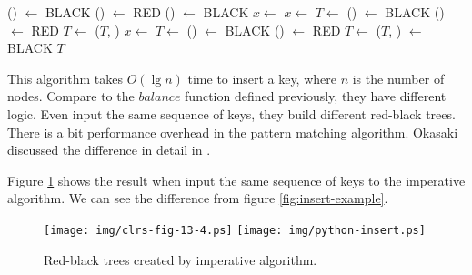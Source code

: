 \documentclass[b5paper]{article}
\begin{document}
\begin{algorithmic}[1]
      \State {}() $\gets$ BLACK
      \State {}() $\gets$ RED
      \State {}() $\gets$ BLACK
      \State $x \gets$ 
    \Else
          \State $x \gets$ 
          \State $T \gets$ 
        \EndIf
        \State {}() $\gets$ BLACK
        \State {}() $\gets$ RED
        \State $T \gets$ ($T$, )
      \Else
          \State $x \gets$ 
          \State $T \gets$ 
        \EndIf
        \State {}() $\gets$ BLACK
        \State {}() $\gets$ RED
        \State $T \gets$ ($T$, )
      \EndIf
    \EndIf
  \EndWhile
  \State {} $\gets$ BLACK
  \State \Return $T$
\EndFunction
\end{algorithmic}

This algorithm takes $O(\lg n)$ time to insert a key, where $n$ is the number of nodes. Compare to the $balance$ function defined previously, they have different logic. Even input the same sequence of keys, they build different red-black trees. There
is a bit performance overhead in the pattern matching algorithm.
Okasaki discussed the difference in detail in \cite{okasaki}.

Figure \ref{fig:imperative-insert} shows the result when input the same sequence of keys to the imperative algorithm. We can see the difference from figure \ref{fig:insert-example}.

\begin{figure}[htbp]
   \centering
   \texttt{[image: img/clrs-fig-13-4.ps]}
   \texttt{[image: img/python-insert.ps]}
   \caption{Red-black trees created by imperative algorithm.}
   \label{fig:imperative-insert}
\end{figure}
\end{document}
